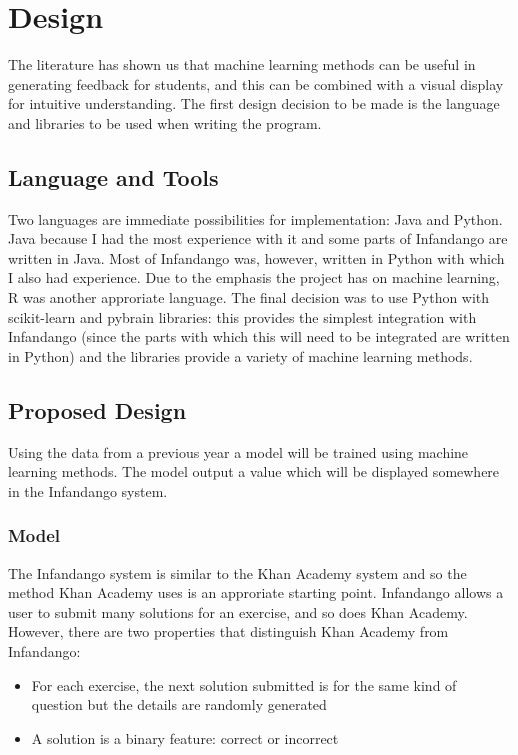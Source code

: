 \chapter{Design}
\label{design}
The literature has shown us that machine learning methods can be useful in generating feedback for students, and this can be combined with a visual display for intuitive understanding. The first design decision to be made is the language and libraries to be used when writing the program.
\section{Language and Tools}
Two languages are immediate possibilities for implementation: Java\cite{java_site} and Python\cite{python_site}. Java because I had the most experience with it and some parts of Infandango are written in Java. Most of Infandango was, however, written in Python with which I also had experience. Due to the emphasis the project has on machine learning, R\cite{r_site} was another approriate language. 
The final decision was to use Python with scikit-learn\cite{scikit_site} and pybrain\cite{pybrain_site} libraries: this provides the simplest integration with Infandango (since the parts with which this will need to be integrated are written in Python) and the libraries provide a variety of machine learning methods.

\section{Proposed Design}
Using the data from a previous year a model will be trained using machine learning methods. The model output a value which will be displayed somewhere in the Infandango system.
\subsection{Model}
The Infandango system is similar to the Khan Academy system and so the method Khan Academy uses is an approriate starting point. Infandango allows a user to submit many solutions for an exercise, and so does Khan Academy. However, there are two properties that distinguish Khan Academy from Infandango:

\begin{itemize}
\item For each exercise, the next solution submitted is for the same kind of question but the details are randomly generated %
\item A solution is a binary feature: correct or incorrect
\end{itemize}

